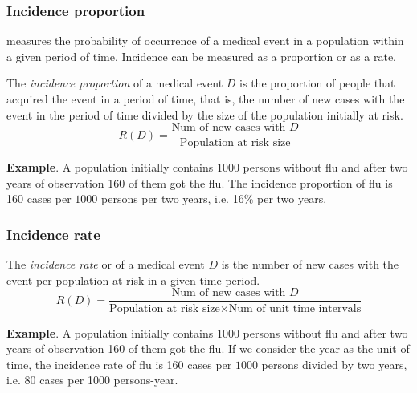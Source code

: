 \begin{frame}
\frametitle{Incidence proportion}
 measures the probability of occurrence of a medical event in a population within a given period of time.
Incidence can be measured as a proportion or as a rate.

\begin{definition}
The \emph{incidence proportion} of a medical event $D$ is the proportion of people that acquired the event in a period of time, that is, the number of new cases with the event in the period of time divided by the size of the population initially at risk.
\[
  R(D)=\frac{\mbox{Num of new cases with $D$}}{\mbox{Population at risk size}}
\]
\end{definition}

\textbf{Example}. A population initially contains $1000$ persons without flu and after two years of observation 160 of them got the flu. 
The incidence proportion of flu is 160 cases per $1000$ persons per two years, i.e. 16\% per two years.
\end{frame}
  

\begin{frame}
\frametitle{Incidence rate}
  
\begin{definition}
The \emph{incidence rate} or of a medical event $D$ is the number of new cases with the event per population at risk in a given time period.
\[
  R(D)=\frac{\mbox{Num of new cases with $D$}}{\mbox{Population at risk size}\times \mbox{Num of unit time intervals}}
\]
\end{definition}

\textbf{Example}. A population initially contains $1000$ persons without flu and after two years of observation 160 of them got the flu. 
If we consider the year as the unit of time, the incidence rate of flu is 160 cases per $1000$ persons divided by two years, i.e. 80 cases per 1000 persons-year.
\end{frame}


